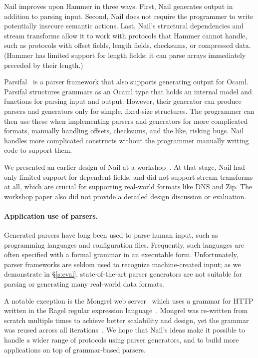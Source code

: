 Nail improves upon Hammer in three ways.  First, Nail generates output in
addition to parsing input.  Second, Nail does not require the programmer
to write potentially insecure semantic actions.  Last, Nail's structural
dependencies and stream transforms allow it to work with protocols that
Hammer cannot handle, such as protocols with offset fields, length fields,
checksums, or compressed data.  (Hammer has limited support for length
fields: it can parse arrays immediately preceded by their length.)

Parsifal~\cite{ANSSI:parsifal} is a parser framework that also supports
generating output for Ocaml.  Parsifal structures grammars as an Ocaml
type that holds an internal model and functions for parsing input and
output.  However, their generator can produce parsers and generators
only for simple, fixed-size structures.  The programmer can then use
these when implementing parsers and generators for more complicated
formats, manually handling offsets, checksums, and the like, risking bugs.
Nail handles more complicated constructs without the programmer manually
writing code to support them.

We presented an earlier design of Nail at a
workshop~\cite{bangert:nail-langsec-anon}.  At that stage, Nail had only
limited support for dependent fields, and did not support stream
transforms at all, which are crucial for supporting real-world formats
like DNS and Zip.  The workshop paper also did not provide a detailed
design discussion or evaluation.


\paragraph{Application use of parsers.}

Generated parsers have long been used to parse human input, such
as programming languages and configuration files. Frequently, such
languages are often specified with a formal grammar in an executable
form. Unfortunately, parser frameworks are seldom used to recognize
machine-created input; as we demonstrate in \S\ref{s:eval},
state-of-the-art parser generators are not suitable for parsing or
generating many real-world data formats.

A notable exception is the Mongrel web server~\cite{mongrel} which
uses a grammar for HTTP written in the Ragel regular expression
language~\cite{ragel-paper}.  Mongrel was re-written from scratch
multiple times to achieve better scalability and design, yet the
grammar was reused across all iterations~\cite{patterson-citation}.
We hope that Nail's ideas make it possible to handle a wider range of
protocols using parser generators, and to build more applications on
top of grammar-based parsers.


